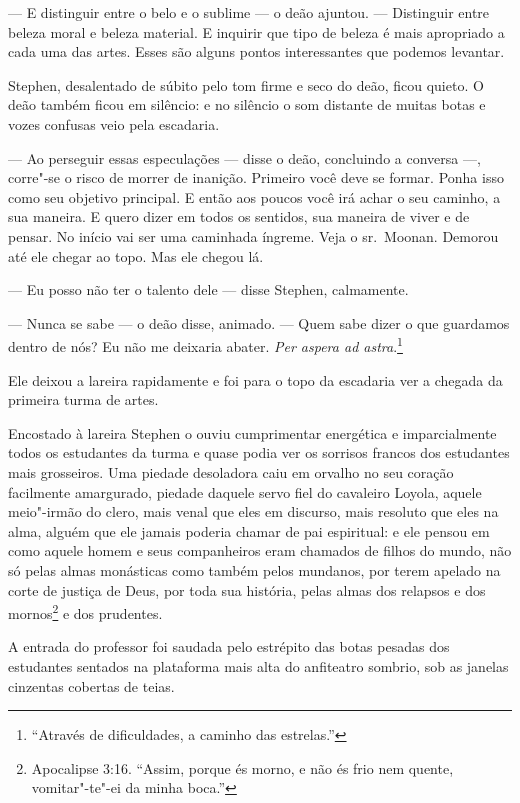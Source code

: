  --- E distinguir entre o belo e o sublime --- o deão ajuntou. --- Distinguir
entre beleza moral e beleza material. E inquirir que tipo de beleza é
mais apropriado a cada uma das artes. Esses são alguns pontos
interessantes que podemos levantar.

Stephen, desalentado de súbito pelo tom firme e seco do deão, ficou
quieto. O deão também ficou em silêncio: e no silêncio o som distante
de muitas botas e vozes confusas veio pela escadaria.

 --- Ao perseguir essas especulações --- disse o deão, concluindo a conversa ---,
corre"-se o risco de morrer de inanição. Primeiro você deve se formar.
Ponha isso como seu objetivo principal. E então aos poucos você irá
achar o seu caminho, a sua maneira. E quero dizer em todos os sentidos,
sua maneira de viver e de pensar. No início vai ser uma caminhada íngreme. 
Veja o sr.~Moonan. Demorou até ele chegar ao topo. Mas ele 
chegou lá.

 --- Eu posso não ter o talento dele --- disse Stephen, calmamente.

 --- Nunca se sabe --- o deão disse, animado. --- Quem sabe dizer o que guardamos
dentro de nós? Eu não me deixaria abater.\textit{ Per aspera ad
astra}.\footnote{ “Através de dificuldades, a caminho das
estrelas.”}

Ele deixou a lareira rapidamente e foi para o topo da escadaria ver a
chegada da primeira turma de artes.

Encostado à lareira Stephen o ouviu cumprimentar energética e
imparcialmente todos os estudantes da turma e quase podia ver os
sorrisos francos dos estudantes mais grosseiros. Uma piedade desoladora
caiu em orvalho no seu coração facilmente amargurado, piedade daquele
servo fiel do cavaleiro Loyola, aquele meio"-irmão do clero, mais venal 
que eles em discurso, mais resoluto que eles na alma, alguém que ele
jamais poderia chamar de pai espiritual: e ele pensou em como aquele
homem e seus companheiros eram chamados de filhos do mundo, não só
pelas almas monásticas como também pelos mundanos, por terem apelado na
corte de justiça de Deus, por toda sua história, pelas almas dos
relapsos e dos mornos\footnote{ Apocalipse 3:16. “Assim, porque és
morno, e não és frio nem quente, vomitar"-te"-ei da minha boca.”} e dos
prudentes.

A entrada do professor foi saudada pelo estrépito das botas pesadas dos
estudantes sentados na plataforma mais alta do anfiteatro sombrio, sob
as janelas cinzentas cobertas de teias.

